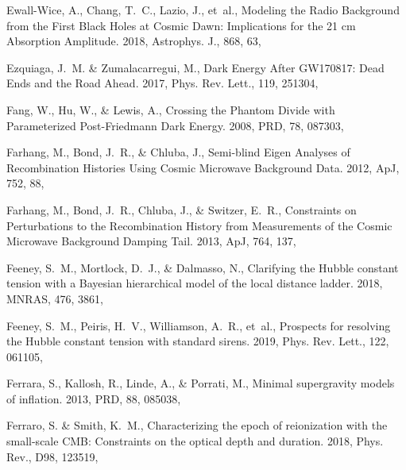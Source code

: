 \documentclass[longauth,traditabstract]{aa}
\def\apj{{ApJ}}
\def\mnras{{MNRAS}}
\def\prd{{PRD}}
\begin{document}
\begin{thebibliography}{379}
Ewall-Wice, A., Chang, T.~C., Lazio, J., {et~al.}, {Modeling the Radio
  Background from the First Black Holes at Cosmic Dawn: Implications for the 21
  cm Absorption Amplitude}. 2018, Astrophys. J., 868, 63, 

Ezquiaga, J.~M. \& Zumalacarregui, M., {Dark Energy After GW170817: Dead Ends
  and the Road Ahead}. 2017, Phys. Rev. Lett., 119, 251304, 

Fang, W., Hu, W., \& Lewis, A., {Crossing the Phantom Divide with Parameterized
  Post-Friedmann Dark Energy}. 2008, \prd, 78, 087303, 

{Farhang}, M., {Bond}, J.~R., \& {Chluba}, J., {Semi-blind Eigen Analyses of
  Recombination Histories Using Cosmic Microwave Background Data}. 2012, \apj,
  752, 88, 

{Farhang}, M., {Bond}, J.~R., {Chluba}, J., \& {Switzer}, E.~R., {Constraints
  on Perturbations to the Recombination History from Measurements of the Cosmic
  Microwave Background Damping Tail}. 2013, \apj, 764, 137, 

{Feeney}, S.~M., {Mortlock}, D.~J., \& {Dalmasso}, N., {Clarifying the Hubble
  constant tension with a Bayesian hierarchical model of the local distance
  ladder}. 2018, \mnras, 476, 3861, 

Feeney, S.~M., Peiris, H.~V., Williamson, A.~R., {et~al.}, {Prospects for
  resolving the Hubble constant tension with standard sirens}. 2019, Phys. Rev.
  Lett., 122, 061105, 

{Ferrara}, S., {Kallosh}, R., {Linde}, A., \& {Porrati}, M., {Minimal
  supergravity models of inflation}. 2013, \prd, 88, 085038, 

Ferraro, S. \& Smith, K.~M., {Characterizing the epoch of reionization with the
  small-scale CMB: Constraints on the optical depth and duration}. 2018, Phys.
  Rev., D98, 123519, 


\end{thebibliography}
\end{document}
